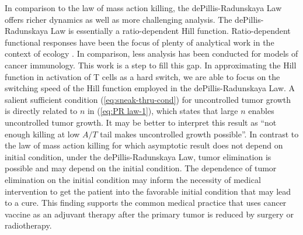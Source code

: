 \documentclass[review,authoryear]{elsarticle}
\begin{document}
In comparison to the law of mass action killing, the dePillis-Radunskaya
Law offers richer dynamics as well as more challenging analysis. The
dePillis-Radunskaya Law is essentially a ratio-dependent Hill function.
Ratio-dependent functional responses have been the focus of plenty
of analytical work in the context of ecology \citep{Abrams2000,Hsu2001,Hsu2003}.
In comparison, less analysis has been conducted for models of cancer
immunology. This work is a step to fill this gap. In approximating
the Hill function in activation of T cells as a hard switch, we are
able to focus on the switching speed of the Hill function employed
in the dePillis-Radunskaya Law. A salient sufficient condition (\ref{eq:sneak-thru-cond}) for
uncontrolled tumor growth is directly related to $n$ in (\ref{eq:PR law-1}), which states that large $n$ enables
uncontrolled tumor growth. It may be better to interpret this result as ``not
enough killing at low $A/T$ tail makes uncontrolled growth possible''.
In contrast to the law of mass action killing for which asymptotic
result does not depend on initial condition, under the dePillis-Radunskaya
Law, tumor elimination is possible and may depend on the initial
condition. The dependence of tumor elimination on the initial condition may inform the necessity of medical intervention to get
the patient into the favorable initial condition that may lead to
a cure. This finding supports the common medical practice
that uses cancer vaccine as an adjuvant therapy after the primary
tumor is reduced by surgery or radiotherapy.
\end{document}
